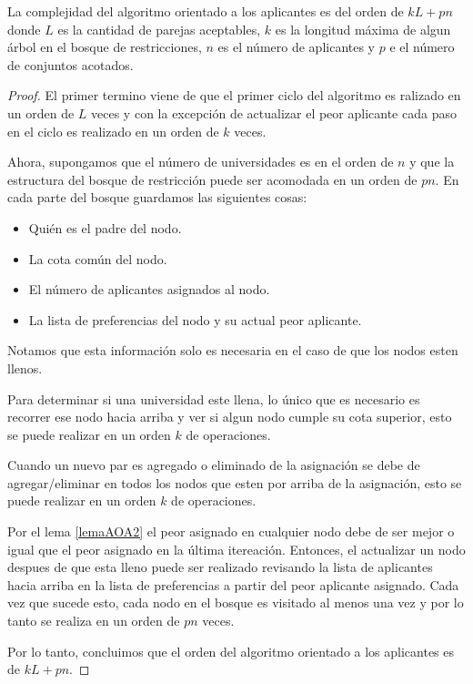 \begin{teo}
La complejidad del algoritmo orientado a los aplicantes es del orden de $kL+pn$ donde $L$ es la cantidad de parejas aceptables, $k$ es la longitud máxima de algun árbol en el bosque de restricciones, $n$ es el número de aplicantes y $p$ e el número de conjuntos acotados. 
\end{teo}
\begin{proof}
El primer termino viene de que el primer ciclo del algoritmo es ralizado en un orden de $L$ veces y con la excepción de actualizar el peor aplicante cada paso en el ciclo es realizado en un orden de $k$ veces.  

Ahora, supongamos que el número de universidades es en el orden de $n$ y que la estructura del bosque de restricción puede ser acomodada en un orden de $pn$. En cada parte del bosque guardamos las siguientes cosas:
\begin{itemize}
\item Quién es el padre del nodo. 
\item La cota común del nodo. 
\item El número de aplicantes asignados al nodo.
\item La lista de preferencias del nodo y su actual peor aplicante. 
\end{itemize}
Notamos que esta información solo es necesaria en el caso de que los nodos esten llenos. 

Para determinar si una universidad este llena, lo único que es necesario es recorrer ese nodo hacia arriba y ver si algun nodo cumple su cota superior, esto se puede realizar en un orden $k$ de operaciones. 

Cuando un nuevo par es agregado o eliminado de la asignación se debe de agregar/eliminar en todos los nodos que esten por arriba de la asignación, esto se puede realizar en un orden $k$ de operaciones. 

Por el lema \ref{lemaAOA2} el peor asignado en cualquier nodo debe de ser mejor o igual que el peor asignado en la última itereación. Entonces, el actualizar un nodo despues de que esta lleno puede ser realizado revisando la lista de aplicantes hacia arriba en la lista de preferencias a partir del peor aplicante asignado. Cada vez que sucede esto, cada nodo en el bosque es visitado al menos una vez y por lo tanto se realiza en un orden de $pn$ veces.

Por lo tanto, concluimos que el orden del algoritmo orientado a los aplicantes es de $kL+pn$.

\end{proof}


